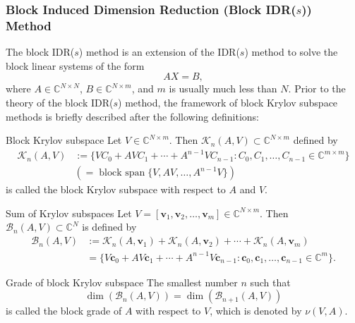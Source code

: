 \subsubsection{{Block Induced Dimension Reduction (Block IDR($s$)) Method}}\label{subsec:block-idr-method}
{The block IDR($s$) method  is an extension of the IDR($s$) method to solve the block linear systems of the form}
\begin{equation}\label{eq:block-linear-system}AX=B,\end{equation}
{where $A\in\mathbb C^{N\times N}$, $B\in\mathbb C^{N\times m}$, and $m$ is usually much less than $N$.}
{Prior to the theory of the block IDR($s$) method, the framework of block Krylov subspace methods is briefly described after the following definitions:}
\par{}
\begin{Definition}{{Block Krylov subspace}}\label{def:block-krylov-subspace}
{Let $V\in\mathbb C^{N\times m}$. Then $\mathcal K_n(A,V)\subset\mathbb C^{N\times m}$ defined by}
\[\begin{aligned}\mathcal K_n(A,V)&:=\{VC_0+AVC_1+\cdots+A^{n-1}VC_{n-1}:C_0,C_1,\ldots,C_{n-1}\in\mathbb C^{m\times m}\}\\&(=\operatorname{block\ span}\{V,AV,\ldots,A^{n-1}V\})\end{aligned}\]
{is called the block Krylov subspace with respect to $A$ and $V$.}
\end{Definition}
\par{}
\begin{Definition}{{Sum of Krylov subspaces}}\label{def:block-krylov-sum}
{Let $V=[\bm v_1,\bm v_2,\ldots,\bm v_m]\in\mathbb C^{N\times m}$. Then $\mathcal B_n(A,V)\subset\mathbb C^N$ is defined by}
\[\begin{aligned}\mathcal B_n(A,V)&:=\mathcal K_n(A,\bm v_1)+\mathcal K_n(A,\bm v_2)+\cdots+\mathcal K_n(A,\bm v_m)\\&=\{V\bm c_0+AV\bm c_1+\cdots+A^{n-1}V\bm c_{n-1}:\bm c_0,\bm c_1,\ldots,\bm c_{n-1}\in\mathbb C^m\}.\end{aligned}\]
\end{Definition}
\par{}
\begin{Definition}{{Grade of block Krylov subspace}}\label{def:block-krylov-grade}
{The smallest number $n$ such that}
\[\dim(\mathcal B_n(A,V))=\dim(\mathcal B_{n+1}(A,V))\]
{is called the block grade of $A$ with respect to $V$, which is denoted by $\nu(V,A)$.}
\end{Definition}
